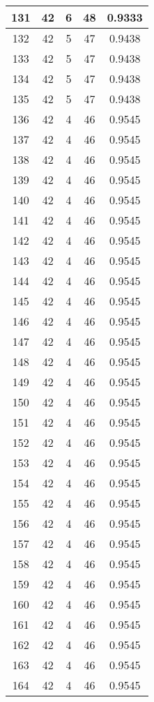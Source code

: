 \documentclass[letterpaper, 12pt]{article}
\begin{document}
\begin{longtable}{|c|c|c|c|c|}
\hline
131 & 42 & 6 & 48 & 0.9333 \\
\hline
132 & 42 & 5 & 47 & 0.9438 \\
\hline
133 & 42 & 5 & 47 & 0.9438 \\
\hline
134 & 42 & 5 & 47 & 0.9438 \\
\hline
135 & 42 & 5 & 47 & 0.9438 \\
\hline
136 & 42 & 4 & 46 & 0.9545 \\
\hline
137 & 42 & 4 & 46 & 0.9545 \\
\hline
138 & 42 & 4 & 46 & 0.9545 \\
\hline
139 & 42 & 4 & 46 & 0.9545 \\
\hline
140 & 42 & 4 & 46 & 0.9545 \\
\hline
141 & 42 & 4 & 46 & 0.9545 \\
\hline
142 & 42 & 4 & 46 & 0.9545 \\
\hline
143 & 42 & 4 & 46 & 0.9545 \\
\hline
144 & 42 & 4 & 46 & 0.9545 \\
\hline
145 & 42 & 4 & 46 & 0.9545 \\
\hline
146 & 42 & 4 & 46 & 0.9545 \\
\hline
147 & 42 & 4 & 46 & 0.9545 \\
\hline
148 & 42 & 4 & 46 & 0.9545 \\
\hline
149 & 42 & 4 & 46 & 0.9545 \\
\hline
150 & 42 & 4 & 46 & 0.9545 \\
\hline
151 & 42 & 4 & 46 & 0.9545 \\
\hline
152 & 42 & 4 & 46 & 0.9545 \\
\hline
153 & 42 & 4 & 46 & 0.9545 \\
\hline
154 & 42 & 4 & 46 & 0.9545 \\
\hline
155 & 42 & 4 & 46 & 0.9545 \\
\hline
156 & 42 & 4 & 46 & 0.9545 \\
\hline
157 & 42 & 4 & 46 & 0.9545 \\
\hline
158 & 42 & 4 & 46 & 0.9545 \\
\hline
159 & 42 & 4 & 46 & 0.9545 \\
\hline
160 & 42 & 4 & 46 & 0.9545 \\
\hline
161 & 42 & 4 & 46 & 0.9545 \\
\hline
162 & 42 & 4 & 46 & 0.9545 \\
\hline
163 & 42 & 4 & 46 & 0.9545 \\
\hline
164 & 42 & 4 & 46 & 0.9545 \\

\end{longtable}
\end{document}
